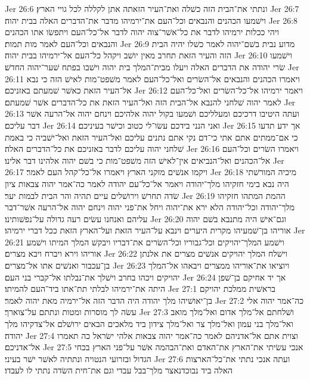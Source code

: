 Jer 26:6  ונתתי את־הבית הזה כשׁלה ואת־העיר הזאתה אתן לקללה לכל גויי הארץ׃
Jer 26:7  וישׁמעו הכהנים והנבאים וכל־העם את־ירמיהו מדבר את־הדברים האלה בבית יהוה׃
Jer 26:8  ויהי ככלות ירמיהו לדבר את כל־אשׁר־צוה יהוה לדבר אל־כל־העם ויתפשׂו אתו הכהנים והנבאים וכל־העם לאמר מות תמות׃
Jer 26:9  מדוע נבית בשׁם־יהוה לאמר כשׁלו יהיה הבית הזה והעיר הזאת תחרב מאין יושׁב ויקהל כל־העם אל־ירמיהו בבית יהוה׃
Jer 26:10  וישׁמעו שׂרי יהודה את הדברים האלה ויעלו מבית־המלך בית יהוה וישׁבו בפתח שׁער־יהוה החדשׁ׃
Jer 26:11  ויאמרו הכהנים והנבאים אל־השׂרים ואל־כל־העם לאמר משׁפט־מות לאישׁ הזה כי נבא אל־העיר הזאת כאשׁר שׁמעתם באזניכם׃
Jer 26:12  ויאמר ירמיהו אל־כל־השׂרים ואל־כל־העם לאמר יהוה שׁלחני להנבא אל־הבית הזה ואל־העיר הזאת את כל־הדברים אשׁר שׁמעתם׃
Jer 26:13  ועתה היטיבו דרכיכם ומעלליכם ושׁמעו בקול יהוה אלהיכם וינחם יהוה אל־הרעה אשׁר דבר עליכם׃
Jer 26:14  ואני הנני בידכם עשׂו־לי כטוב וכישׁר בעיניכם׃
Jer 26:15  אך ידע תדעו כי אם־ממתים אתם אתי כי־דם נקי אתם נתנים עליכם ואל־העיר הזאת ואל־ישׁביה כי באמת שׁלחני יהוה עליכם לדבר באזניכם את כל־הדברים האלה׃
Jer 26:16  ויאמרו השׂרים וכל־העם אל־הכהנים ואל־הנביאים אין־לאישׁ הזה משׁפט־מות כי בשׁם יהוה אלהינו דבר אלינו׃
Jer 26:17  ויקמו אנשׁים מזקני הארץ ויאמרו אל־כל־קהל העם לאמר׃
Jer 26:18  מיכיה המורשׁתי היה נבא בימי חזקיהו מלך־יהודה ויאמר אל־כל־עם יהודה לאמר כה־אמר יהוה צבאות ציון שׂדה תחרשׁ וירושׁלים עיים תהיה והר הבית לבמות יער׃
Jer 26:19  ההמת המתהו חזקיהו מלך־יהודה וכל־יהודה הלא ירא את־יהוה ויחל את־פני יהוה וינחם יהוה אל־הרעה אשׁר־דבר עליהם ואנחנו עשׂים רעה גדולה על־נפשׁותינו׃
Jer 26:20  וגם־אישׁ היה מתנבא בשׁם יהוה אוריהו בן־שׁמעיהו מקרית היערים וינבא על־העיר הזאת ועל־הארץ הזאת ככל דברי ירמיהו׃
Jer 26:21  וישׁמע המלך־יהויקים וכל־גבוריו וכל־השׂרים את־דבריו ויבקשׁ המלך המיתו וישׁמע אוריהו וירא ויברח ויבא מצרים׃
Jer 26:22  וישׁלח המלך יהויקים אנשׁים מצרים את אלנתן בן־עכבור ואנשׁים אתו אל־מצרים׃
Jer 26:23  ויוציאו את־אוריהו ממצרים ויבאהו אל־המלך יהויקים ויכהו בחרב וישׁלך את־נבלתו אל־קברי בני העם׃
Jer 26:24  אך יד אחיקם בן־שׁפן היתה את־ירמיהו לבלתי תת־אתו ביד־העם להמיתו׃
Jer 27:1  בראשׁית ממלכת יהויקם בן־יאושׁיהו מלך יהודה היה הדבר הזה אל־ירמיה מאת יהוה לאמר׃
Jer 27:2  כה־אמר יהוה אלי עשׂה לך מוסרות ומטות ונתתם על־צוארך׃
Jer 27:3  ושׁלחתם אל־מלך אדום ואל־מלך מואב ואל־מלך בני עמון ואל־מלך צר ואל־מלך צידון ביד מלאכים הבאים ירושׁלם אל־צדקיהו מלך יהודה׃
Jer 27:4  וצוית אתם אל־אדניהם לאמר כה־אמר יהוה צבאות אלהי ישׂראל כה תאמרו אל־אדניכם׃
Jer 27:5  אנכי עשׂיתי את־הארץ את־האדם ואת־הבהמה אשׁר על־פני הארץ בכחי הגדול ובזרועי הנטויה ונתתיה לאשׁר ישׁר בעיני׃
Jer 27:6  ועתה אנכי נתתי את־כל־הארצות האלה ביד נבוכדנאצר מלך־בבל עבדי וגם את־חית השׂדה נתתי לו לעבדו׃
